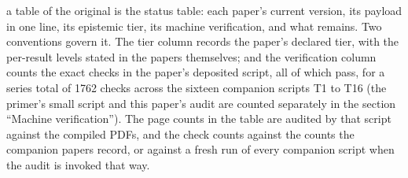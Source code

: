 \documentclass[11pt]{article}
\theoremstyle{definition}
\theoremstyle{plain}
\begin{document}
\label{c:note.programme.setting-series-paper-paper-2}
a table of the original is the status table: each paper's current version, its payload in one line, its epistemic tier, its machine verification, and what remains. Two conventions govern it. The tier column records the paper's declared tier, with the per-result levels stated in the papers themselves; and the verification column counts the exact checks in the paper's deposited script, all of which pass, for a series total of 1762 checks across the sixteen companion scripts T1 to T16 (the primer's small script and this paper's audit are counted separately in the section ``Machine verification''). The page counts in the table are audited by that script against the compiled PDFs, and the check counts against the counts the companion papers record, or against a fresh run of every companion script when the audit is invoked that way.
\end{document}
